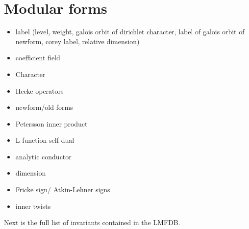 
\chapter{Modular forms}

\begin{itemize}
    \item label (level, weight, galois orbit of dirichlet character, label of galois orbit of newform, corey label, relative dimension)
    \item coefficient field
    \item Character
    \item Hecke operators
    \item newform/old forms
    \item Petersson inner product
    \item L-function self dual
    \item analytic conductor
    \item dimension
    \item Fricke sign/ Atkin-Lehner signs
    \item inner twists
\end{itemize}

Next is the full list of invariants contained in the LMFDB.


